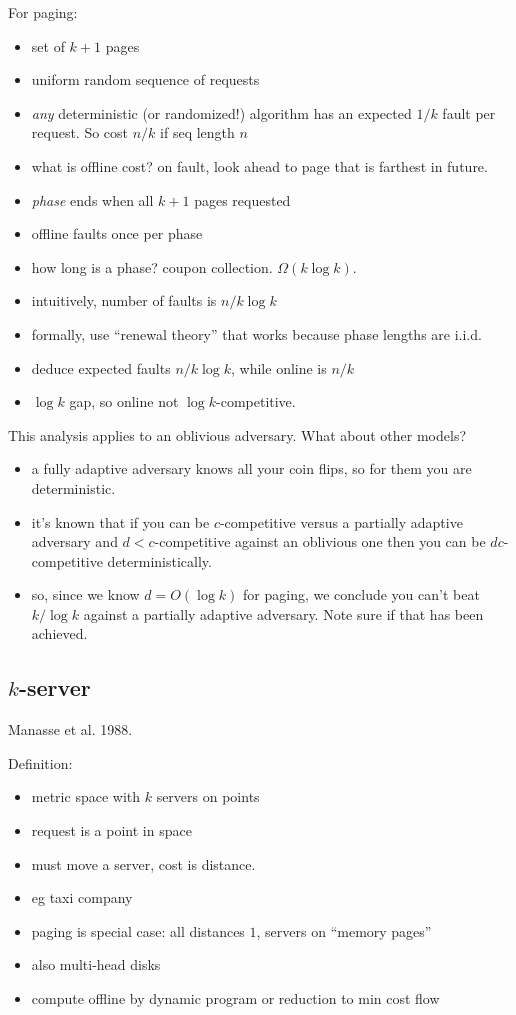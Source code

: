 \documentclass{article}
\begin{document}
For paging:
\begin{itemize}
\item set of $k+1$ pages
\item uniform random sequence of requests
\item \emph{any} deterministic (or randomized!) algorithm has an
  expected $1/{k}$ fault per request.  So cost $n/k$ if seq
  length $n$
\item what is offline cost?  on fault, look ahead to page that is
  farthest in future.
\item \emph{phase} ends when all $k+1$ pages requested
\item offline faults once per phase
\item how long is a phase?  coupon collection.  $\Omega(k\log k)$.
\item intuitively, number of faults is $n/k\log k$
\item formally, use ``renewal theory'' that works because phase
  lengths are i.i.d.
\item deduce expected faults $n/k\log k$, while online is $n/k$
\item $\log k$ gap, so online not $\log k$-competitive.
\end{itemize}
  


This analysis applies to an oblivious adversary.  What about other
models?
\begin{itemize}
\item a fully adaptive adversary knows all your coin flips, so for
  them you are deterministic.
\item it's known that if you can be $c$-competitive versus a partially
  adaptive adversary and $d<c$-competitive against an oblivious one
  then you can be $dc$-competitive deterministically.  
\item so, since we know $d=O(\log k)$ for paging, we conclude you
  can't beat $k/\log k$ against a partially adaptive adversary.  Note
  sure if that has been achieved.
\end{itemize}

\subsection{$k$-server}

Manasse et al. 1988.

Definition:
\begin{itemize}
\item metric space with $k$ servers on points
\item request is a point in space
\item must move a server, cost is distance.
\item eg taxi company
\item paging is special case: all distances $1$, servers on ``memory
  pages''
\item also multi-head disks
\item compute offline by dynamic program or reduction to min cost flow
\end{itemize}
\end{document}
